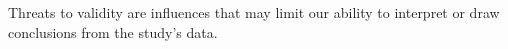 Threats to validity are influences that may limit our ability to interpret or draw conclusions from the study's data. \cite{challenges}
